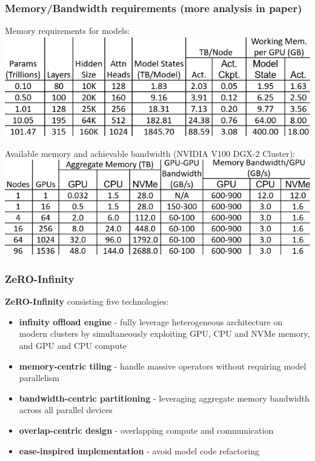 \documentclass{beamer}
\begin{document}
\begin{frame}
    \frametitle{Memory/Bandwidth requirements \footnotesize{(more analysis in paper})}
    \begin{center}
        \footnotesize{Memory requirements for models:}
        \includegraphics[scale=1.35]{img/zero_infinity_mem_requirements.png}
    \end{center}
    \begin{center}
        \footnotesize{Available memory and achievable bandwidth (NVIDIA V100
DGX-2 Cluster):}
        \includegraphics[scale=1.35]{img/zero_infinity_mem_available.png}
    \end{center}
\end{frame}

\begin{frame}
    \frametitle{ZeRO-Infinity}
    \textbf{ZeRO-Infinity} consisting five technologies:
    \begin{itemize}
        \item \textbf{infinity offload engine} - fully leverage heterogeneous architecture on modern clusters by simultaneously exploiting GPU, CPU and NVMe memory, and GPU and CPU compute
        \item \textbf{memory-centric tiling} - handle massive operators without requiring model parallelism
        \item \textbf{bandwidth-centric partitioning} - leveraging aggregate memory bandwidth across all parallel devices
        \item \textbf{overlap-centric design} - overlapping compute and communication
        \item \textbf{ease-inspired implementation} - avoid model code refactoring
    \end{itemize}
\end{frame}
\end{document}
